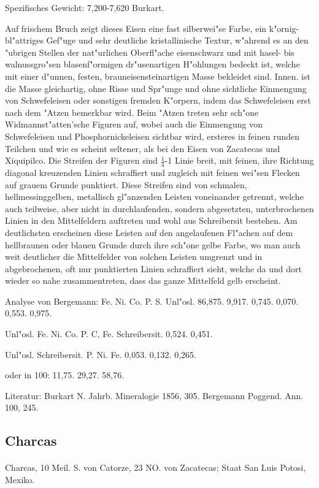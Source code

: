 \documentclass[a4paper, 11pt, oneside]{article}
\begin{document}
Spezifisches Gewicht: 7,200-7,620 Burkart.

Auf frischem Bruch zeigt dieses Eisen eine fast silberwei"se Farbe, ein k"ornig-bl"attriges Gef"uge und sehr deutliche kristallinische Textur, w"ahrend es an den "ubrigen Stellen der nat"urlichen Oberfl"ache eisenschwarz und mit hasel- bis walnussgro"sen blasenf"ormigen dr"usenartigen H"ohlungen bedeckt ist, welche mit einer d"unnen, festen, brauneisensteinartigen Masse bekleidet sind. Innen. ist die Masse gleichartig, ohne Risse und Spr"unge und ohne sichtliche Einmengung von Schwefeleisen oder sonstigen fremden K"orpern, indem das Schwefeleisen erst nach dem "Atzen bemerkbar wird. Beim "Atzen treten sehr sch"one Widmannst"atten'sche Figuren auf, wobei auch die Einmengung von Schwefeleisen und Phosphornickeleisen sichtbar wird, ersteres in feinen runden Teilchen und wie es scheint seltener, als bei den Eisen von Zacatecas und Xiquipilco. Die Streifen der Figuren sind $\frac{1}{4}$-1 Linie breit, mit feinen, ihre Richtung diagonal kreuzenden Linien schraffiert und zugleich mit feinen wei"sen Flecken auf grauem Grunde punktiert. Diese Streifen sind von schmalen, hellmessinggelben, metallisch gl"anzenden Leisten voneinander getrennt, welche auch teilweise, aber nicht in durchlaufenden, sondern abgesetzten, unterbrochenen Linien in den Mittelfeldern auftreten und wohl aus Schreibersit bestehen. Am deutlichsten erscheinen diese Leisten auf den angelaufenen Fl"achen auf dem hellbraunen oder blauen Grunde durch ihre sch"one gelbe Farbe, wo man auch weit deutlicher die Mittelfelder von solchen Leisten umgrenzt und in abgebrochenen, oft nur punktierten Linien schraffiert sieht, welche da und dort wieder so nahe zusammentreten, dass das ganze Mittelfeld gelb erscheint.

Analyse von Bergemann:
Fe. Ni. Co. P. S.  Unl"osl.  
86,875. 9,917. 0,745. 0,070. 0,553. 0,975.

Unl"osl. {  
Fe. Ni. Co. P. C, Fe. Schreibersit.  
0,524. 0,451.  
}

Unl"osl. Schreibersit. {
P. Ni. Fe.  
0,053. 0,132. 0,265.  
}

oder in 100: 11,75. 29,27. 58,76.

Literatur: Burkart N. Jahrb. Mineralogie 1856, 305. Bergemann Poggend. Ann. 100, 245.

\subsection{Charcas}
\normalsize
\paragraph{}
Charcas, 10 Meil. S. von Catorze, 23 NO. von Zacatecas; Staat San Luis Potosi, Mexiko.
\end{document}
